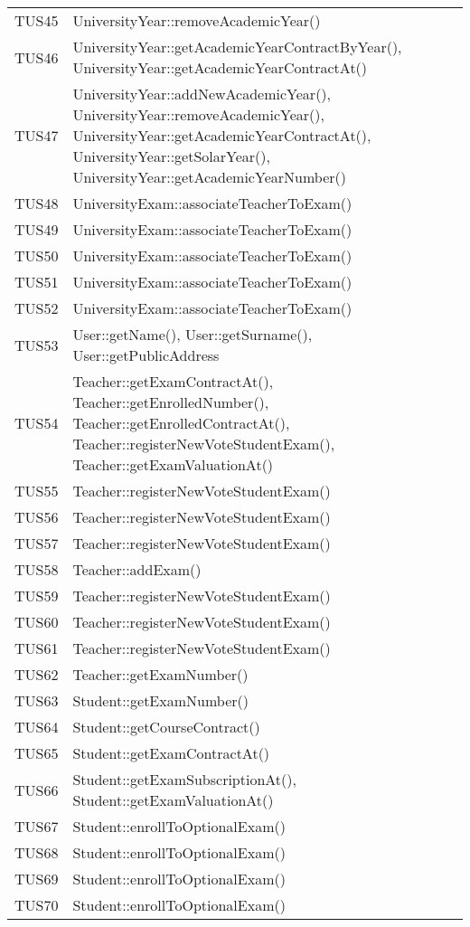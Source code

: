 \documentclass[PianoDiQualifica.tex]{subfiles}
\begin{document}
\begin{longtable}[H]{P{5cm}P{9cm}}
	TUS45 & UniversityYear::removeAcademicYear()\\
	TUS46 & UniversityYear::getAcademicYearContractByYear(), UniversityYear::getAcademicYearContractAt()\\
	TUS47 & UniversityYear::addNewAcademicYear(), UniversityYear::removeAcademicYear(), UniversityYear::getAcademicYearContractAt(), UniversityYear::getSolarYear(), UniversityYear::getAcademicYearNumber()\\
	TUS48 & UniversityExam::associateTeacherToExam() \\
	TUS49 & UniversityExam::associateTeacherToExam() \\
	TUS50 & UniversityExam::associateTeacherToExam() \\
	TUS51 & UniversityExam::associateTeacherToExam() \\
	TUS52 & UniversityExam::associateTeacherToExam() \\
	TUS53 & User::getName(), User::getSurname(), User::getPublicAddress \\
	TUS54 & Teacher::getExamContractAt(), Teacher::getEnrolledNumber(), Teacher::getEnrolledContractAt(), Teacher::registerNewVoteStudentExam(), Teacher::getExamValuationAt()\\
	TUS55 & Teacher::registerNewVoteStudentExam()\\
	TUS56 & Teacher::registerNewVoteStudentExam()\\
	TUS57 & Teacher::registerNewVoteStudentExam()\\
	TUS58 & Teacher::addExam()\\
	TUS59 & Teacher::registerNewVoteStudentExam()\\
	TUS60 & Teacher::registerNewVoteStudentExam()\\
	TUS61 & Teacher::registerNewVoteStudentExam()\\
	TUS62 & Teacher::getExamNumber()\\
	TUS63 & Student::getExamNumber()\\
	TUS64 & Student::getCourseContract()\\
	TUS65 & Student::getExamContractAt()\\
	TUS66 & Student::getExamSubscriptionAt(), Student::getExamValuationAt()\\
	TUS67 & Student::enrollToOptionalExam()\\
	TUS68 & Student::enrollToOptionalExam()\\
	TUS69 & Student::enrollToOptionalExam()\\
	TUS70 & Student::enrollToOptionalExam()\\

\end{longtable}
\end{document}
